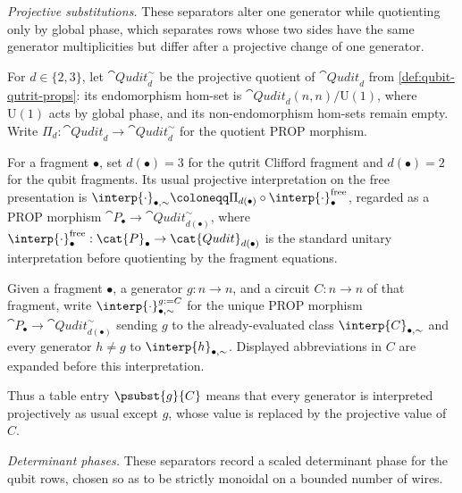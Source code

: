 \emph{Projective substitutions.}
These separators alter one generator while quotienting only by global phase, which separates rows
whose two sides have the same generator multiplicities but differ after a projective change of one
generator.

\begin{definition}\label{def:projective-quotient}
For \(d\in\{2,3\}\), let \(\cat{Qudit}_d^{\sim}\) be the projective quotient of
\(\cat{Qudit}_d\) from \cref{def:qubit-qutrit-props}: its endomorphism hom-set
is \(\cat{Qudit}_d(n,n)/\mathrm{U}(1)\), where \(\mathrm{U}(1)\) acts by global
phase, and its non-endomorphism hom-sets remain empty.  Write
\(\Pi_d:\cat{Qudit}_d\to\cat{Qudit}_d^{\sim}\) for the quotient PROP morphism.
\end{definition}

\begin{definition}\label{def:projective-interpretation}
For a fragment \(\bullet\), set \(d(\bullet)=3\) for the qutrit Clifford
fragment and \(d(\bullet)=2\) for the qubit fragments.  Its usual projective
interpretation on the free presentation is
\(\interp{\cdot}_{\bullet,\sim}\coloneqq
\Pi_{d(\bullet)}\circ\interp{\cdot}^{\mathrm{free}}_\bullet\), regarded as a
PROP morphism \(\cat{P}_\bullet\to\cat{Qudit}_{d(\bullet)}^{\sim}\), where
\(\interp{\cdot}^{\mathrm{free}}_\bullet:\cat{P}_\bullet\to
\cat{Qudit}_{d(\bullet)}\) is the standard unitary interpretation before
quotienting by the fragment equations.
\end{definition}

\begin{definition}\label{def:projective-subst}
Given a fragment \(\bullet\), a generator \(g:n\to n\), and a circuit \(C:n\to n\) of that fragment, write
\(\interp{\cdot}_{\bullet,\sim}^{g:=C}\) for the unique PROP morphism
\(\cat{P}_\bullet\to\cat{Qudit}_{d(\bullet)}^{\sim}\) sending \(g\) to the already-evaluated
class \(\interp{C}_{\bullet,\sim}\) and every generator \(h\neq g\) to
\(\interp{h}_{\bullet,\sim}\).  Displayed abbreviations in \(C\) are expanded before this
interpretation.
\end{definition}

Thus a table entry \(\psubst{g}{C}\) means that every generator is interpreted projectively as
usual except \(g\), whose value is replaced by the projective value of \(C\).

\emph{Determinant phases.}
These separators record a scaled determinant phase for the qubit rows, chosen so as to be strictly
monoidal on a bounded number of wires.

